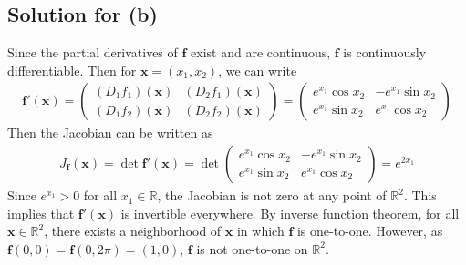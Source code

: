 \documentclass{scrartcl}
\begin{document}
\subsection{Solution for (b)}
Since the partial derivatives of \(\mathbf{f}\) exist and are continuous,
\(\mathbf{f}\) is continuously differentiable. Then for \(\mathbf{x} = (x_1,
x_2)\), we can write
\begin{align*}
  \mathbf{f}'(\mathbf{x})
  = \begin{pmatrix}
    (D_1 f_1) (\mathbf{x}) & (D_2 f_1) (\mathbf{x}) \\
    (D_1 f_2) (\mathbf{x}) & (D_2 f_2) (\mathbf{x})
  \end{pmatrix}
  = \begin{pmatrix}
    e^{x_1} \cos x_2 & -e^{x_1} \sin x_2 \\
    e^{x_1} \sin x_2 & e^{x_1} \cos x_2
  \end{pmatrix}
\end{align*}
Then the Jacobian can be written as
\begin{align*}
  J_\mathbf{f}(\mathbf{x})
  = \det \mathbf{f}'(\mathbf{x})
  = \det \begin{pmatrix}
    e^{x_1} \cos x_2 & -e^{x_1} \sin x_2 \\
    e^{x_1} \sin x_2 & e^{x_1} \cos x_2
  \end{pmatrix}
  = e^{2x_1}
\end{align*}
Since \(e^{x_1} > 0\) for all \(x_1 \in \mathbb{R}\), the Jacobian is not zero
at any point of \(\mathbb{R}^2\). This implies that \(\mathbf{f}'(\mathbf{x})\)
is invertible everywhere. By inverse function theorem, for all \(\mathbf{x} \in
\mathbb{R}^2\), there exists a neighborhood of \(\mathbf{x}\) in which
\(\mathbf{f}\) is one-to-one. However, as \(\mathbf{f}(0, 0) = \mathbf{f}(0,
2\pi) = (1, 0)\), \(\mathbf{f}\) is not one-to-one on \(\mathbb{R}^2\).
\end{document}
